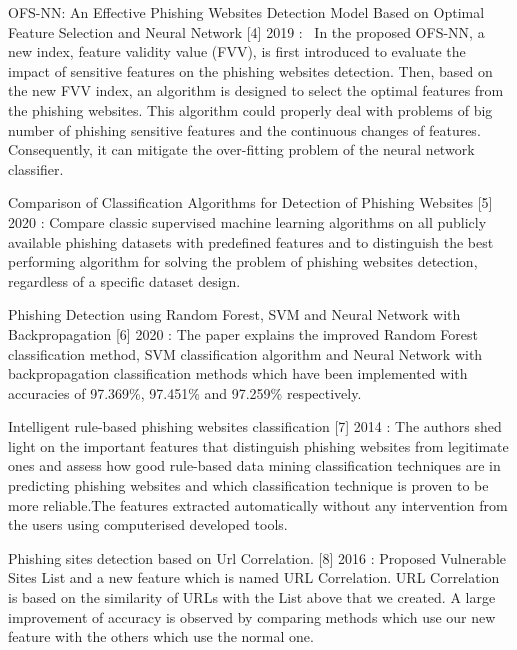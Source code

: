 \hspace{.2cm} OFS-NN: An Effective Phishing Websites Detection Model Based on Optimal Feature Selection and Neural Network
[4] 2019 :  In the proposed OFS-NN, a new index, feature validity value (FVV), is first introduced to evaluate the impact of sensitive features on the phishing websites detection. Then, based on the new FVV index, an algorithm is designed to select the optimal features from the phishing websites. This algorithm could properly deal with problems of big number of phishing sensitive features and the continuous changes of features. Consequently, it can mitigate the over-fitting problem of the neural network classifier.

\hspace{.2cm} Comparison of Classification Algorithms for Detection of Phishing Websites
[5] 2020 : Compare classic supervised machine learning algorithms on all publicly available phishing datasets with predefined features and to distinguish the best performing algorithm for solving the problem of phishing websites detection, regardless of a specific dataset design.
 

\hspace{.2cm} Phishing Detection using Random Forest, SVM and Neural Network with Backpropagation
[6] 2020 : The paper explains the improved Random Forest classification method, SVM classification algorithm and Neural Network with backpropagation classification methods which have been implemented with accuracies of 97.369\%, 97.451\% and 97.259\% respectively.


\hspace{.2cm} Intelligent rule-based phishing websites classification
[7] 2014 : The authors shed light on the important features that distinguish phishing websites from legitimate ones and assess how good rule-based data mining classification techniques are in predicting phishing websites and which classification technique is proven to be more reliable.The features extracted automatically without any intervention from the users using computerised developed tools.



\hspace{.2cm} Phishing sites detection based on Url Correlation.
[8] 2016 : Proposed Vulnerable Sites List and a new feature which is named URL Correlation. URL Correlation is based on the similarity of URLs with the List above that we created. A large improvement of accuracy is observed by comparing methods which use our new feature with the others which use the normal one.



